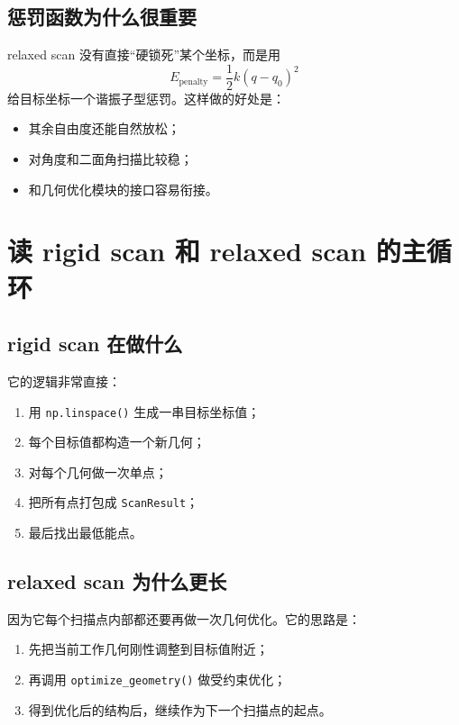 \documentclass[UTF8,11pt,fontset=fandol]{ctexbook}
\begin{document}


\subsection*{惩罚函数为什么很重要}

relaxed scan 没有直接“硬锁死”某个坐标，而是用
\begin{equation}
E_{\mathrm{penalty}}=\frac{1}{2}k(q-q_0)^2
\end{equation}
给目标坐标一个谐振子型惩罚。这样做的好处是：
\begin{itemize}
  \item 其余自由度还能自然放松；
  \item 对角度和二面角扫描比较稳；
  \item 和几何优化模块的接口容易衔接。
\end{itemize}

\section{读 rigid scan 和 relaxed scan 的主循环}





\subsection*{rigid scan 在做什么}

它的逻辑非常直接：
\begin{enumerate}[label=\arabic*.]
  \item 用 \texttt{np.linspace()} 生成一串目标坐标值；
  \item 每个目标值都构造一个新几何；
  \item 对每个几何做一次单点；
  \item 把所有点打包成 \texttt{ScanResult}；
  \item 最后找出最低能点。
\end{enumerate}

\subsection*{relaxed scan 为什么更长}

因为它每个扫描点内部都还要再做一次几何优化。它的思路是：
\begin{enumerate}[label=\arabic*.]
  \item 先把当前工作几何刚性调整到目标值附近；
  \item 再调用 \texttt{optimize\_geometry()} 做受约束优化；
  \item 得到优化后的结构后，继续作为下一个扫描点的起点。
\end{enumerate}
\end{document}
